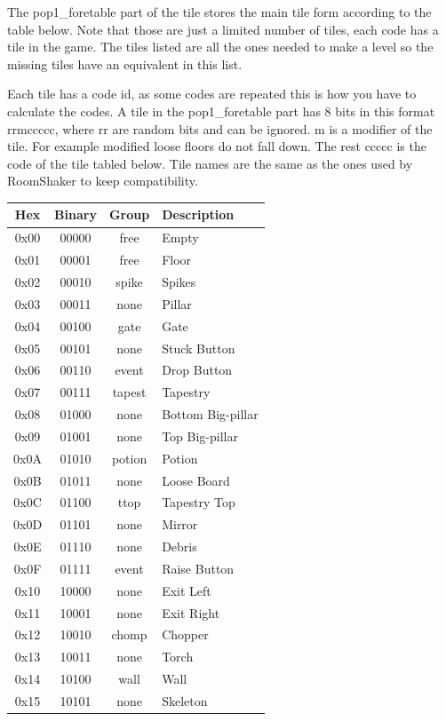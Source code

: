 \documentclass{article}
\begin{document}
 The pop1\_foretable part of the tile stores the main tile form according to
 the table below. Note that those are just a limited number of tiles, each
 code has a tile in the game. The tiles listed are all the ones needed to
 make a level so the missing tiles have an equivalent in this list.

 Each tile has a code id, as some codes are repeated this is how you have
 to calculate the codes. A tile in the pop1\_foretable part has 8 bits in
 this format rrmccccc, where rr are random bits and can be ignored. m is a
 modifier of the tile. For example modified loose floors do not fall down.
 The rest ccccc is the code of the tile tabled below. Tile names are the
 same as the ones used by RoomShaker to keep compatibility.

\begin{table}
\begin{tabular}{cccl}
\hline
 Hex & Binary& Group & Description \\
\hline
0x00 & 00000 & free  & Empty \\
0x01 & 00001 & free  & Floor \\
0x02 & 00010 & spike & Spikes \\
0x03 & 00011 & none  & Pillar \\
0x04 & 00100 & gate  & Gate \\
0x05 & 00101 & none  & Stuck Button \\
0x06 & 00110 & event & Drop Button \\
0x07 & 00111 & tapest& Tapestry \\
0x08 & 01000 & none  & Bottom Big-pillar \\
0x09 & 01001 & none  & Top Big-pillar \\
0x0A & 01010 & potion& Potion \\
0x0B & 01011 & none  & Loose Board \\
0x0C & 01100 & ttop  & Tapestry Top \\
0x0D & 01101 & none  & Mirror \\
0x0E & 01110 & none  & Debris \\
0x0F & 01111 & event & Raise Button \\
0x10 & 10000 & none  & Exit Left \\
0x11 & 10001 & none  & Exit Right \\
0x12 & 10010 & chomp & Chopper \\
0x13 & 10011 & none  & Torch \\
0x14 & 10100 & wall  & Wall \\
0x15 & 10101 & none  & Skeleton \\

\end{tabular}
\end{table}
\end{document}
